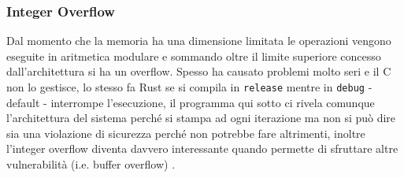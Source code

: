 \documentclass{article}
\begin{document}






\subsubsection{Integer Overflow}
Dal momento che la memoria ha una dimensione limitata le operazioni vengono eseguite in aritmetica modulare e sommando oltre il limite superiore concesso dall'architettura si ha un overflow. Spesso ha causato problemi molto seri e il C non lo gestisce, lo stesso fa Rust se si compila in \texttt{release} mentre in \texttt{debug} - default - interrompe l'esecuzione, il programma qui sotto ci rivela comunque l'architettura del sistema perché si stampa ad ogni iterazione ma non si può dire sia una violazione di sicurezza perché non potrebbe fare altrimenti, inoltre l'integer overflow diventa davvero interessante quando permette di sfruttare altre vulnerabilità (i.e. buffer overflow) \cite[10.2.3]{gollmann:computersecurity}. 






\end{document}
